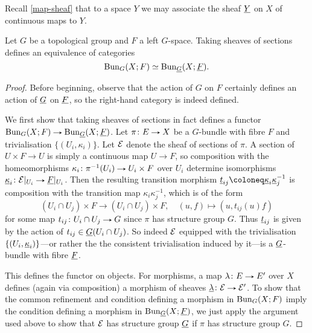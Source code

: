 Recall \cref{map-sheaf}
that to a space $Y$ we may associate the sheaf $\underline{Y}$ on $X$ of
continuous maps to $Y$.

\begin{proposition}
  Let $G$ be a topological group and $F$ a left $G$-space. Taking
  sheaves of sections defines an equivalence of categories
  \[
  \operatorname{Bun}_G(X;F) \simeq \operatorname{Bun}_{\underline{G}}(X;\underline{F}).
  \]
\end{proposition}

\begin{proof}
  Before beginning, observe that the action of $G$ on $F$ certainly
  defines an action of $\underline{G}$ on $\underline{F}$, so the right-hand category
  is indeed defined.

  We first show that taking sheaves of sections in fact defines a
  functor $\Bun_G(X;F) \to \Bun_{\u{G}}(X;\u{F})$. Let $\pi \c E \to
  X$ be a $G$-bundle with fibre $F$ and trivialisation
  $\{(U_i,\kappa_i)\}$. Let $\mathcal{E}$ denote the sheaf of sections of
  $\pi$. A section of $U \times F \to U$ is simply a continuous map $U
  \to F$, so composition with the homeomorphisms $\kappa_i \c
  \pi^{-1}(U_i) \to U_i \times F$ over $U_i$ determine isomorphisms
  $\u{\kappa}_i \c \E|_{U_i} \to \u{F}|_{U_i}$. Then the resulting
  transition morphism $\u{t}_{ij} \ce \u{\kappa}_i\u{\kappa}_j^{-1}$
  is composition with the transition map $\kappa_i\kappa_j^{-1}$,
  which is of the form
  \[
  (U_i \cap U_j) \times F \to (U_i \cap U_j) \times F, \quad
  (u,f) \mapsto (u, t_{ij}(u)f)
  \]
  for some map $t_{ij} \c U_i \cap U_j \to G$ since $\pi$ has
  structure group $G$. Thus $\underline{t}_{ij}$ is given by the action of
  $t_{ij} \in \underline{G}(U_i \cap U_j)$. So indeed $\mathcal{E}$ equipped with the
  trivialisation $\{(U_i, \underline{\kappa}_i)\}$---or rather the the
  consistent trivialisation induced by it---is a $\underline{G}$-bundle with
  fibre $\underline{F}$.

  This defines the functor on objects. For morphisms, a map $\lambda
  \c E \to E'$ over $X$ defines (again via composition) a morphism of
  sheaves $\u{\lambda} \c \E \to \E'$. To show that the common
  refinement and condition defining a morphism in $\operatorname{Bun}_G(X;F)$ imply
  the condition defining a morphism in $\operatorname{Bun}_{\underline{G}}(X;\underline{F})$, we
  just apply the argument used above to show that $\mathcal{E}$ has structure
  group $\underline{G}$ if $\pi$ has structure group $G$.


\end{proof}

